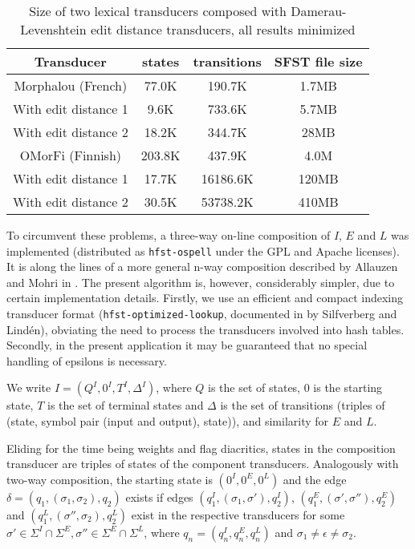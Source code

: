 \documentclass[draft]{llncs}
\begin{document}
\begin{table}
  \centering
  \caption{Size of two lexical transducers composed with
    Damerau-Levenshtein edit distance transducers, all results minimized}
  \label{composed_error_table}
  \begin{tabular}{ c c c c }
    \hline
    Transducer               & states   & transitions & SFST file size \\ \hline
    Morphalou (French)       & 77.0K    & 190.7K   & 1.7MB \\
    With edit distance 1     & 9.6K     & 733.6K   & 5.7MB \\
    With edit distance 2     & 18.2K    & 344.7K  & 28MB \\ \hline
    OMorFi (Finnish)         & 203.8K   & 437.9K   & 4.0M \\
    With edit distance 1     & 17.7K    & 16186.6K & 120MB \\
    With edit distance 2     & 30.5K    & 53738.2K & 410MB \\ \hline
  \end{tabular}

\end{table}

To circumvent these problems, a three-way on-line composition of $I$, $E$ and
$L$ was implemented (distributed as \verb!hfst-ospell!
under the GPL and Apache licenses). It is along the lines of a more general
n-way composition described by Allauzen and Mohri in \cite{allauzen/2009}.
The present algorithm is, however, considerably simpler, due to certain
implementation details. Firstly, we use an efficient and compact indexing
transducer format (\verb!hfst-optimized-lookup!, documented in
\cite{silfverberg/2009/ol} by Silfverberg and Lind\'{e}n), obviating the
need to process the transducers involved into hash tables. Secondly,
in the present application it may be guaranteed that no special handling
of epsilons is necessary.

We write $I = (Q^I, 0^I, T^I, \Delta^I)$, where $Q$
is the set of states, $0$ is the starting state, $T$ is the set of terminal
states and $\Delta$ is the set of transitions (triples of (state, symbol pair
(input and output), state)), and similarity for $E$ and $L$.

Eliding for the time being weights and flag diacritics, states in the
composition transducer are triples of states of the component transducers.
Analogously with two-way composition, the starting state is $(0^I, 0^E, 0^L)$
and the edge $\delta = (q_1, (\sigma_1, \sigma_2), q_2)$ exists if edges
$(q^I_1, (\sigma_1, \sigma'), q^I_2)$,
$(q^E_1, (\sigma', \sigma''), q^E_2)$ and
$(q^L_1, (\sigma'', \sigma_2), q^L_2)$ exist in the respective transducers
for some
$\sigma' \in \Sigma^I \cap \Sigma^E, \sigma'' \in \Sigma^E \cap \Sigma^L$,
where $q_n = (q^I_n, q^E_n, q^L_n)$ and $\sigma_1 \neq \epsilon \neq \sigma_2$.
\end{document}
